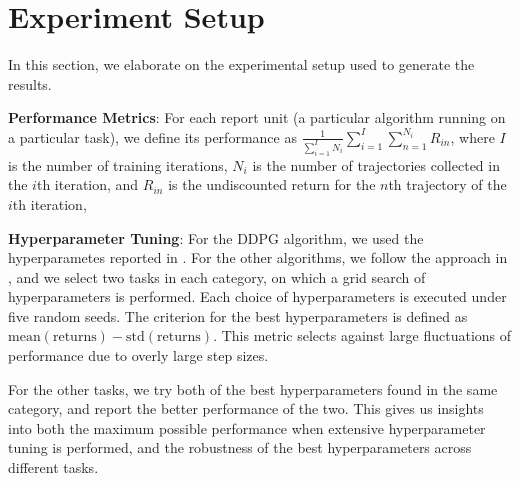 \documentclass{article}
\begin{document}
\section{Experiment Setup}

In this section, we elaborate on the experimental setup used to generate the results.

{\bf Performance Metrics}: For each report unit (a particular algorithm running on a particular task), we define its performance as $\frac{1}{\sum_{i=1}^I N_i} \sum_{i=1}^I \sum_{n=1}^{N_i} R_{in}$, where $I$ is the number of training iterations, $N_i$ is the number of trajectories collected in the $i$th iteration, and $R_{in}$ is the undiscounted return for the $n$th trajectory of the $i$th iteration,


{\bf Hyperparameter Tuning}: For the DDPG algorithm, we used the hyperparametes reported in \citet{Lillicrap15}. For the other algorithms, we follow the approach in \cite{Mnih15}, and we select two tasks in each category, on which a grid search of hyperparameters is performed. Each choice of hyperparameters is executed under five random seeds. The criterion for the best hyperparameters is defined as $\mathrm{mean}(\mathrm{returns}) - \mathrm{std}(\mathrm{returns})$. This metric selects against large fluctuations of performance due to overly large step sizes. 

For the other tasks, we try both of the best hyperparameters found in the same category, and report the better performance of the two. This gives us insights into both the maximum possible performance when extensive hyperparameter tuning is performed, and the robustness of the best hyperparameters across different tasks.
\end{document}
